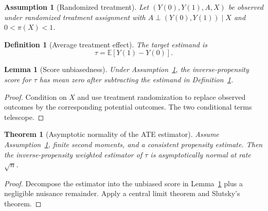 \documentclass{article}
\newtheorem{assumption}{Assumption}
\newtheorem{definition}{Definition}
\newtheorem{theorem}{Theorem}
\newtheorem{lemma}{Lemma}
\begin{document}
\begin{assumption}[Randomized treatment]\label{ass:randomized}
Let $(Y(0),Y(1),A,X)$ be observed under randomized treatment assignment with
$A \perp (Y(0),Y(1)) \mid X$ and $0 < \pi(X) < 1$.
\end{assumption}

\begin{definition}[Average treatment effect]\label{def:ate}
The target estimand is
\[
\tau = \mathbb{E}[Y(1)-Y(0)].
\]
\end{definition}

\begin{lemma}[Score unbiasedness]\label{lem:score-unbiased}
Under Assumption~\ref{ass:randomized}, the inverse-propensity score for
$\tau$ has mean zero after subtracting the estimand in Definition~\ref{def:ate}.
\end{lemma}
\begin{proof}
Condition on $X$ and use treatment randomization to replace observed outcomes
by the corresponding potential outcomes. The two conditional terms telescope.
\end{proof}

\begin{theorem}[Asymptotic normality of the ATE estimator]\label{thm:ate-clt}
Assume Assumption~\ref{ass:randomized}, finite second moments, and a consistent
propensity estimate. Then the inverse-propensity weighted estimator of $\tau$
is asymptotically normal at rate $\sqrt{n}$.
\end{theorem}
\begin{proof}
Decompose the estimator into the unbiased score in Lemma~\ref{lem:score-unbiased}
plus a negligible nuisance remainder. Apply a central limit theorem and Slutsky's theorem.
\end{proof}
\end{document}
